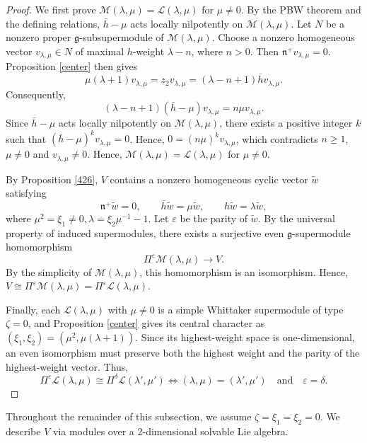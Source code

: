 \documentclass[a4paper,10pt]{article}
\theoremstyle{definition}
\theoremstyle{plain}
\theoremstyle{remark}
\theoremstyle{mystyle}
\numberwithin{equation}{section}
\begin{document}
\begin{proof}
    We first prove $\mathcal{M}(\lambda,\mu)=\mathcal{L}(\lambda,\mu)$ for $\mu\neq 0$.  By the PBW theorem and the defining relations, \(\bar h-\mu\) acts locally nilpotently on \(\mathcal{M}(\lambda,\mu)\). Let $N$ be a nonzero proper $\mathfrak g$-subsupermodule of \(\mathcal{M}(\lambda,\mu)\). Choose a nonzero homogeneous vector \(v_{\lambda,\mu}\in N\) of maximal \(h\)-weight \(\lambda-n\), where \(n>0\). Then $\mathfrak n^+v_{\lambda,\mu}=0$.
    Proposition \ref{center} then gives 
    $$
    \mu(\lambda+1)v_{\lambda,\mu}=z_2v_{\lambda,\mu}=(\lambda-n+1)\bar hv_{\lambda,\mu}.
    $$
    Consequently, 
    $$
    (\lambda-n+1)(\bar h-\mu)v_{\lambda,\mu}=n\mu v_{\lambda,\mu}.
    $$
    Since \(\bar h-\mu\) acts locally nilpotently on \(\mathcal{M}(\lambda,\mu)\), there exists a positive integer \(k\) such that $(\bar h-\mu)^k v_{\lambda,\mu}=0$. Hence, $0=(n\mu)^k v_{\lambda,\mu}$, which contradicts \(n\geq 1\), \(\mu\neq 0\) and \(v_{\lambda,\mu}\neq 0\). Hence, \(\mathcal{M}(\lambda,\mu)=\mathcal L(\lambda,\mu)\) for \(\mu\neq0\).

    By Proposition \ref{426}, \(V\) contains a nonzero homogeneous cyclic vector \(\widetilde w\) satisfying
    \[
    \mathfrak n^+\widetilde w=0,\qquad\bar h\widetilde w=\mu\widetilde w,\qquad h\widetilde w=\lambda\widetilde w,
    \]
    where \(\mu^2=\xi_1\neq0,\lambda=\xi_2\mu^{-1}-1\). Let \(\varepsilon\) be the parity of \(\widetilde w\). By the universal property of induced supermodules, there exists a surjective even \(\mathfrak g\)-supermodule homomorphism
    \[
    \Pi^\varepsilon
    \mathcal M(\lambda,\mu)\to  V.
    \]
    By the simplicity of $\mathcal{M}(\lambda,\mu)$, this homomorphism is an isomorphism. Hence, $V\cong \Pi^{\varepsilon}\mathcal M(\lambda,\mu)=\Pi^{\varepsilon}\mathcal L(\lambda,\mu)$.

    Finally, each \(\mathcal{L}(\lambda,\mu)\) with \(\mu\neq0\) is a simple Whittaker supermodule of type \(\zeta=0\), and Proposition \ref{center} gives its central character as
    $(\xi_1,\xi_2)=(\mu^2,\mu(\lambda+1))$.
    Since its highest-weight space is one-dimensional, an even isomorphism must preserve both the highest weight and the parity of the highest-weight vector. Thus, 
    \[
    \Pi^\varepsilon \mathcal{L}(\lambda,\mu)\cong\Pi^\delta \mathcal{L}(\lambda',\mu')\iff
    (\lambda,\mu)=(\lambda',\mu')
    \quad\text{and}\quad
    \varepsilon=\delta.
    \]
\end{proof}
Throughout the remainder of this subsection, we assume $\zeta=\xi_1=\xi_2=0.$ We describe \(V\) via modules over a 2-dimensional solvable Lie algebra.
\end{document}

